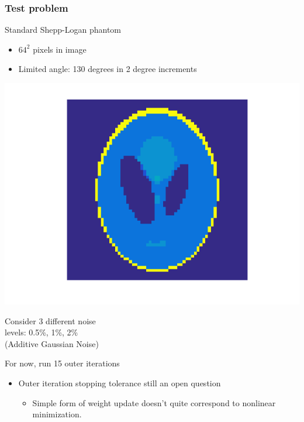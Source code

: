 \documentclass[12pt,t,xcolor=dvipsnames]{beamer}
\begin{document}
\begin{frame}
\frametitle{Test problem}

Standard Shepp-Logan phantom
\begin{itemize}
\item $64^2$ pixels in image
\item Limited angle: 130 degrees in 2 degree increments
\end{itemize}


  \begin{minipage}{0.48\textwidth}
    \begin{center}
      \includegraphics[width=0.9\linewidth]{SheppLogan}
    \end{center}
  \end{minipage}
  \begin{minipage}{0.48\textwidth}
Consider 3 different noise\\ levels: 0.5\%, 1\%, 2\% \\ (Additive
Gaussian Noise)
  \end{minipage}

  For now, run 15 outer iterations
  \begin{itemize}
  \item Outer iteration stopping tolerance still an open question
    \begin{itemize}
      \item Simple form of weight update doesn't quite correspond to
      nonlinear minimization.
    \end{itemize}
  \end{itemize}
  
\end{frame}
\end{document}
